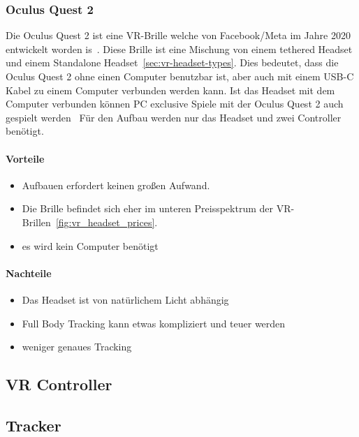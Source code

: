 \subsubsection{Oculus Quest 2}\label{sec:oculus-quest-2}

Die Oculus Quest 2 ist eine VR-Brille welche von Facebook/Meta im Jahre 2020 entwickelt worden is~\cite{ADI_ROBERTSON_2020}.
Diese Brille ist eine Mischung von einem tethered Headset und einem Standalone Headset~\ref{sec:vr-headset-types}.
Dies bedeutet, dass die Oculus Quest 2 ohne einen Computer benutzbar ist, aber auch mit einem USB-C Kabel zu einem Computer verbunden werden kann.
Ist das Headset mit dem Computer verbunden können PC exclusive Spiele mit der Oculus Quest 2 auch gespielt werden~\cite{ADI_ROBERTSON_2020}
Für den Aufbau werden nur das Headset und zwei Controller benötigt.

\paragraph{Vorteile}

\begin{itemize}
    \item Aufbauen erfordert keinen großen Aufwand.
    \item Die Brille befindet sich eher im unteren Preisspektrum der VR-Brillen~\ref{fig:vr_headset_prices}.
    \item es wird kein Computer benötigt
\end{itemize}

\paragraph{Nachteile}

\begin{itemize}
    \item Das Headset ist von natürlichem Licht abhängig~\cite{Dennis_Ziesecke_2019}
    \item Full Body Tracking kann etwas kompliziert und teuer werden~\cite{Martin_Rakver}
    \item weniger genaues Tracking~\cite{Macedo_2020}
\end{itemize}

\subsection{VR Controller}\label{sec:vr-controller}

\subsection{Tracker}\label{sec:tracker}

